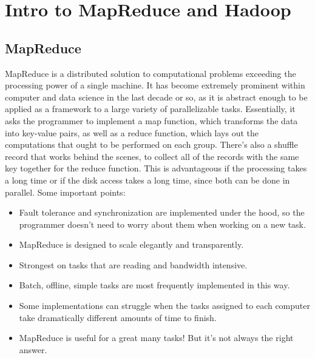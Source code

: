 \section{Intro to MapReduce and Hadoop}
\subsection{MapReduce}
MapReduce is a distributed solution to computational problems exceeding the processing power of a single machine. It has become extremely prominent within computer and data science in the last decade or so, as it is abstract enough to be applied as a framework to a large variety of parallelizable tasks. Essentially, it asks the programmer to implement a map function, which transforms the data into key-value pairs, as well as a reduce function, which lays out the computations that ought to be performed on each group. There's also a shuffle record that works behind the scenes, to collect all of the records with the same key together for the reduce function. This is advantageous if the processing takes a long time or if the disk access takes a long time, since both can be done in parallel. Some important points:\\
\begin{itemize}
\item Fault tolerance and synchronization are implemented under the hood, so the programmer doesn't need to worry about them when working on a new task.
\item MapReduce is designed to scale elegantly and transparently.
\item Strongest on tasks that are reading and bandwidth intensive.
\item Batch, offline, simple tasks are most frequently implemented in this way.
\item Some implementations can struggle when the tasks assigned to each computer take dramatically different amounts of time to finish.
\item MapReduce is useful for a great many tasks! But it's not always the right answer.
\end{itemize}
